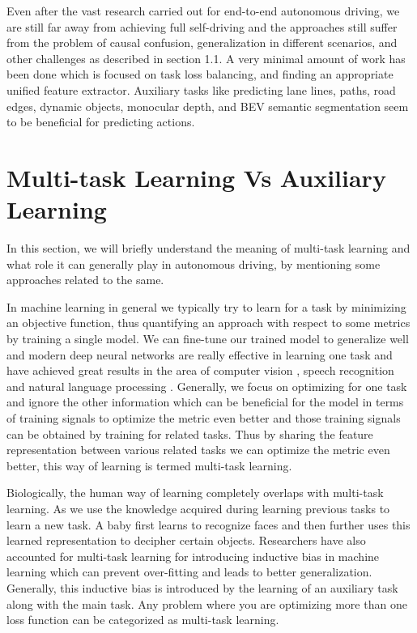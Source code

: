 Even after the vast research carried out for end-to-end autonomous driving, we are still far away from achieving full self-driving and the approaches still suffer from the problem of causal confusion, generalization in different scenarios, and other challenges as described in section 1.1. A very minimal amount of work has been done which is focused on task loss balancing, and finding an appropriate unified feature extractor. Auxiliary tasks like predicting lane lines, paths, road edges, dynamic objects, monocular depth, and BEV semantic segmentation seem to be beneficial for predicting actions.

    \section{Multi-task Learning Vs Auxiliary Learning}
    
    In this section, we will briefly understand the meaning of multi-task learning and what role it can generally play in autonomous driving, by mentioning some approaches related to the same. 
    
    In machine learning in general we typically try to learn for a task by minimizing an objective function, thus quantifying an approach with respect to some metrics by training a single model. We can fine-tune our trained model to generalize well and modern deep neural networks are really effective in learning one task and have achieved great results in the area of computer vision \cite{DBLP:journals/corr/KaiserGSVPJU17} \cite{DBLP:journals/corr/abs-1904-08492}, speech recognition \cite{DBLP:journals/corr/ToshniwalTLL17} and natural language processing \cite{DBLP:journals/corr/KaiserGSVPJU17}. Generally, we focus on optimizing for one task and ignore the other information which can be beneficial for the model in terms of training signals to optimize the metric even better and those training signals can be obtained by training for related tasks. Thus by sharing the feature representation between various related tasks we can optimize the metric even better, this way of learning is termed multi-task learning. 
    
    Biologically, the human way of learning completely overlaps with multi-task learning. As we use the knowledge acquired during learning previous tasks to learn a new task. A baby first learns to recognize faces and then further uses this learned representation to decipher certain objects. Researchers have also accounted for multi-task learning for introducing inductive bias in machine learning which can prevent over-fitting and leads to better generalization. Generally, this inductive bias is introduced by the learning of an auxiliary task along with the main task. Any problem where you are optimizing more than one loss function can be categorized as multi-task learning. 
    
